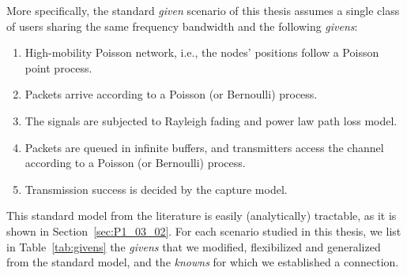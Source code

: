 
More specifically, the standard \textit{given} scenario of this thesis assumes a single class of users sharing the same frequency bandwidth and the following \textit{givens}:
\begin{enumerate}
    \item High-mobility Poisson network, i.e., the nodes' positions follow a Poisson point process.
    \item Packets arrive according to a Poisson (or Bernoulli) process.
    \item The signals are subjected to Rayleigh fading and power law path loss model.
    \item Packets are queued in infinite buffers, and transmitters access the channel according to a Poisson (or Bernoulli) process.
    \item Transmission success is decided by the capture model.
\end{enumerate}

%
This standard model from the literature is easily (analytically) tractable, as it is shown in Section~\ref{sec:P1_03_02}.
%
For each scenario studied in this thesis, we list in Table~\ref{tab:givens} the \textit{givens} that we modified, flexibilized and generalized from the standard model, and the \textit{knowns} for which we established a connection.

